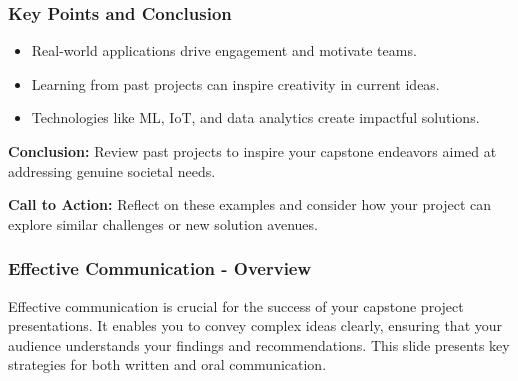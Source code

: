 \documentclass[aspectratio=169]{beamer}
\begin{document}
\begin{frame}[fragile]
    \frametitle{Key Points and Conclusion}
    \begin{itemize}
        \item Real-world applications drive engagement and motivate teams.
        \item Learning from past projects can inspire creativity in current ideas.
        \item Technologies like ML, IoT, and data analytics create impactful solutions.
    \end{itemize}
    
    \textbf{Conclusion:} 
    Review past projects to inspire your capstone endeavors aimed at addressing genuine societal needs. 

    \textbf{Call to Action:} 
    Reflect on these examples and consider how your project can explore similar challenges or new solution avenues.
\end{frame}

\begin{frame}[fragile]
  \frametitle{Effective Communication - Overview}
  Effective communication is crucial for the success of your capstone project presentations. It enables you to convey complex ideas clearly, ensuring that your audience understands your findings and recommendations. This slide presents key strategies for both written and oral communication.
\end{frame}
\end{document}
